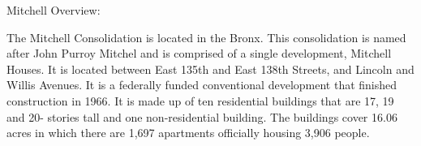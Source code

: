 Mitchell Overview:     

   

The Mitchell Consolidation is located in the Bronx. This consolidation is named after John Purroy Mitchel and is comprised of a single development, Mitchell Houses. It is located between East 135th and East 138th Streets, and Lincoln and Willis Avenues. It is a federally funded conventional development that finished construction in 1966. It is made up of ten residential buildings that are 17, 19 and 20- stories tall and one non-residential building. The buildings cover 16.06 acres in which there are 1,697 apartments officially housing 3,906 people. 